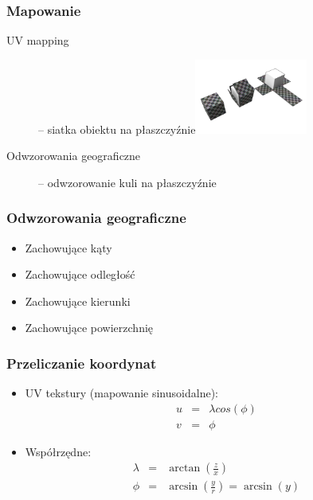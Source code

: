 \documentclass{beamer}
\begin{document}
\frame
{
	\frametitle{Mapowanie}

	\begin{description}
	\item[UV mapping] -- siatka obiektu na płaszczyźnie\includegraphics[width=0.30\textwidth]{img/uv_wrapping.png}
	\pause
	\item[Odwzorowania geograficzne] -- odwzorowanie kuli na płaszczyźnie
	\end{description}
}

\frame
{
	\frametitle{Odwzorowania geograficzne}

	\begin{itemize}
	\item Zachowujące kąty
	\item Zachowujące odległość
	\item Zachowujące kierunki
	\item Zachowujące powierzchnię
	\end{itemize}

	\pause

	\begin{figure}
	\centering
	 \hspace{.0\textwidth}
	\pause
	\label{fig:normmap}
	\end{figure}
	\setcounter{subfigure}{0}
}

\frame
{
	\frametitle{Przeliczanie koordynat}

	\begin{itemize}
	\item UV tekstury (mapowanie sinusoidalne):
		\begin{eqnarray*}
		u &=& \lambda cos(\phi) \\
		v &=& \phi
		\end{eqnarray*}
	\item Współrzędne:
		\begin{eqnarray*}
		\lambda &=& \arctan(\frac{z}{x}) \\
		\phi &=& \arcsin(\frac{y}{r}) = \arcsin(y) 
		\end{eqnarray*}
	\end{itemize}
}
\end{document}
